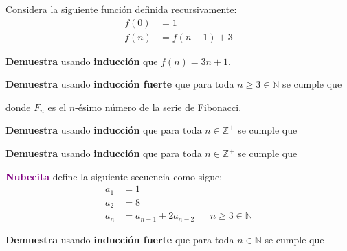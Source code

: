 \documentclass[oneside]{style}
\begin{document}
\begin{questions}[label=\protect\circled{\bfseries\arabic*}]
    \question
    {
        Considera la siguiente función definida recursivamente:
        \begin{align*}
            f(0) &= 1 \\ 
            f(n) &= f(n-1) + 3
        \end{align*}

        \textbf{Demuestra} usando \textbf{inducción} que $f(n) = 3n + 1$. 
    }

    \question
    {
        \textbf{Demuestra} usando \textbf{inducción fuerte} que para toda 
        $n \geq 3 \in \mathbb{N}$ se cumple que
        \begin{center}
        \end{center}

        donde $F_n$ es el $n$-ésimo número de la serie de Fibonacci. 
    }

    \question
    {
        \textbf{Demuestra} usando \textbf{inducción} que para toda 
        $n \in \mathbb{Z}^+$ se cumple que
        \begin{center}
        \end{center}
    }

    \question
    {
        \textbf{Demuestra} usando \textbf{inducción} que para toda 
        $n \in \mathbb{Z}^+$ se cumple que
        \begin{center}
        \end{center}
    }

    \question
    {
        \textcolor{purple}{\textbf{Nubecita}} define la siguiente secuencia 
        como sigue:
        \begin{align*}
            a_1 &= 1 \\ 
            a_2 &= 8 \\ 
            a_{n} &= a_{n-1} + 2a_{n-2} 
            && n \geq 3 \in \mathbb{N}
        \end{align*}

        \textbf{Demuestra} usando \textbf{inducción fuerte} que para toda 
        $n \in \mathbb{N}$ se cumple que 
        \begin{center}
        \end{center}  
    }


\end{questions}
\end{document}

